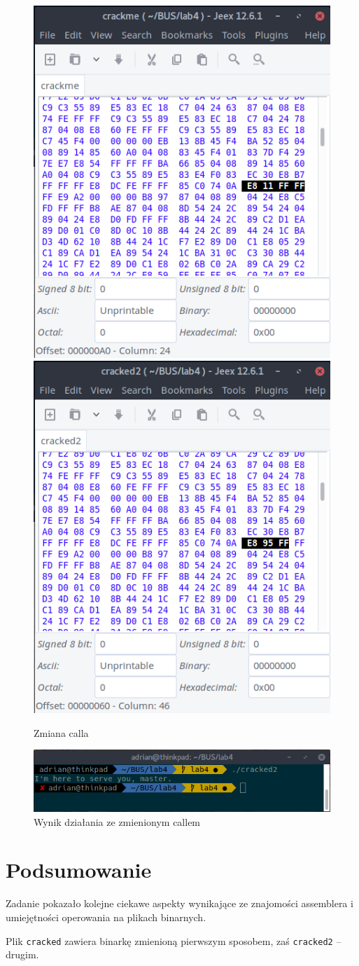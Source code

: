 \documentclass[a4paper]{article}
\begin{document}
	\begin{figure}[H]
		\centering
		\includegraphics[width=.4\textwidth]{img/magia1}
		\includegraphics[width=.4\textwidth]{img/magia2}
		\caption{Zmiana calla}
	\end{figure}

	\begin{figure}[H]
		\centering
		\includegraphics[width=.5\textwidth]{img/magia_result}
		\caption{Wynik działania ze zmienionym callem}
	\end{figure}

	\section{Podsumowanie}
	Zadanie pokazało kolejne ciekawe aspekty wynikające ze znajomości assemblera i umiejętności operowania na plikach binarnych.
	
	Plik \texttt{cracked} zawiera binarkę zmienioną pierwszym sposobem, zaś \texttt{cracked2} -- drugim.
	
\end{document}
